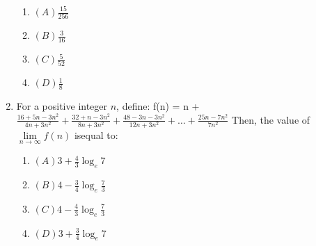 \documentclass{article}
\begin{document}
\begin{enumerate}
\begin{enumerate}
\item $(A) \frac{15}{256} \quad$
\item $(B) \frac{3}{16} \quad$ 
\item $(C) \frac{5}{52} \quad$ 
\item $(D) \frac{1}{8}$

\end{enumerate}

\item For a positive integer \( n \), define: f(n) = n + $\frac{16 + 5n - 3n^2}{4n + 3n^2} + \frac{32+ n - 3n^2}{8n + 3n^2} + \frac{48 - 3n - 3n^2}{12n + 3n^2} + \dots + \frac{25n - 7n^2}{7n^2}$
Then, the value of \( \lim\limits_{n \to \infty} f(n) \) isequal to:
\begin{enumerate}
	\item $(A) 3 + \frac{4}{3} \log_e 7$
	\item $(B) 4 - \frac{3}{4} \log_e \frac{7}{3}$
	\item $(C) 4 - \frac{4}{3} \log_e \frac{7}{3}$
	\item $(D) 3 + \frac{3}{4} \log_e 7$
\end{enumerate}

\end{enumerate}
\end{document}
